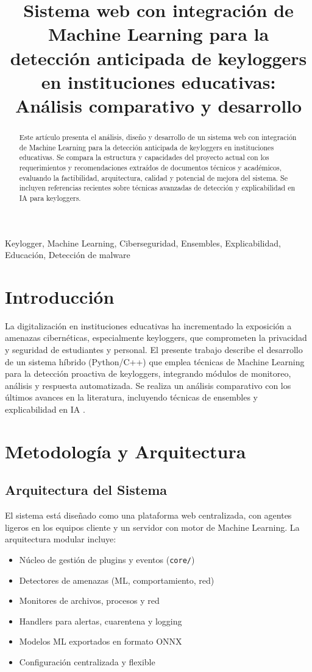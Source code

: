 \documentclass[conference]{IEEEtran}
\title{Sistema web con integración de Machine Learning para la detección anticipada de keyloggers en instituciones educativas: Análisis comparativo y desarrollo}
\author{
    \IEEEauthorblockN{Sebastian Arce Bracamonte, Brant Antony Chata Choque}
    \IEEEauthorblockA{Universidad Privada de Tacna, Perú\\Email: sebarceb@upt.edu.pe, brant.chata@upt.edu.pe}
}
\begin{document}
\maketitle

\begin{abstract}
Este artículo presenta el análisis, diseño y desarrollo de un sistema web con integración de Machine Learning para la detección anticipada de keyloggers en instituciones educativas. Se compara la estructura y capacidades del proyecto actual con los requerimientos y recomendaciones extraídos de documentos técnicos y académicos, evaluando la factibilidad, arquitectura, calidad y potencial de mejora del sistema. Se incluyen referencias recientes sobre técnicas avanzadas de detección y explicabilidad en IA para keyloggers.
\end{abstract}

\begin{IEEEkeywords}
Keylogger, Machine Learning, Ciberseguridad, Ensembles, Explicabilidad, Educación, Detección de malware
\end{IEEEkeywords}

\section{Introducción}
La digitalización en instituciones educativas ha incrementado la exposición a amenazas cibernéticas, especialmente keyloggers, que comprometen la privacidad y seguridad de estudiantes y personal. El presente trabajo describe el desarrollo de un sistema híbrido (Python/C++) que emplea técnicas de Machine Learning para la detección proactiva de keyloggers, integrando módulos de monitoreo, análisis y respuesta automatizada. Se realiza un análisis comparativo con los últimos avances en la literatura, incluyendo técnicas de ensembles y explicabilidad en IA \cite{mahmud2025trustworthy}.

\section{Metodología y Arquitectura}

\subsection{Arquitectura del Sistema}
El sistema está diseñado como una plataforma web centralizada, con agentes ligeros en los equipos cliente y un servidor con motor de Machine Learning. La arquitectura modular incluye:
\begin{itemize}
    \item Núcleo de gestión de plugins y eventos (\texttt{core/})
    \item Detectores de amenazas (ML, comportamiento, red)
    \item Monitores de archivos, procesos y red
    \item Handlers para alertas, cuarentena y logging
    \item Modelos ML exportados en formato ONNX
    \item Configuración centralizada y flexible
\end{itemize}
\end{document}
